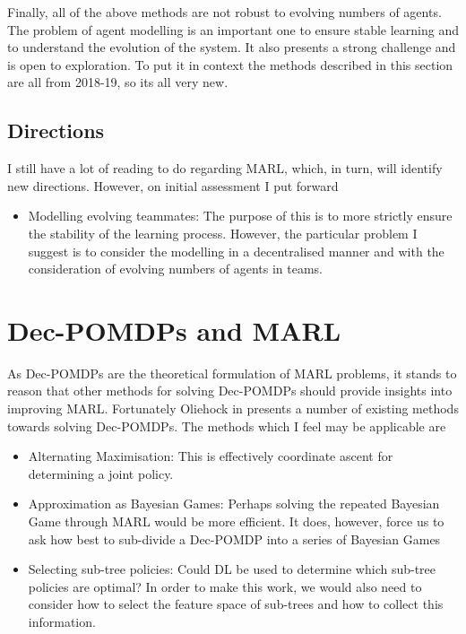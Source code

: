 \documentclass[preprint,8pt]{report}
\begin{document}
Finally, all of the above methods are not robust to evolving numbers of agents. The problem of agent modelling is an important one to ensure stable learning and to understand the evolution of the system. It also presents a strong challenge and is open to exploration. To put it in context the methods described in this section are all from 2018-19, so its all very new.

\subsection{Directions}

I still have a lot of reading to do regarding MARL, which, in turn, will identify new directions. However, on initial assessment I put forward

\begin{itemize}
    \item Modelling evolving teammates: The purpose of this is to more strictly ensure the stability of the learning process. However, the particular problem I suggest is to consider the modelling in a decentralised manner and with the consideration of evolving numbers of agents in teams.
\end{itemize}


\section{Dec-POMDPs and MARL}

As Dec-POMDPs are the theoretical formulation of MARL problems, it stands to reason that other methods for solving Dec-POMDPs should provide insights into improving MARL. Fortunately Oliehock in \cite{OliehoekDecentralizedPOMDPs} presents a number of existing methods towards solving Dec-POMDPs. The methods which I feel may be applicable are 
\begin{itemize}
    \item Alternating Maximisation: This is effectively coordinate ascent for determining a joint policy.
    \item Approximation as Bayesian Games: Perhaps solving the repeated Bayesian Game through MARL would be more efficient. It does, however, force us to ask how best to sub-divide a Dec-POMDP into a series of Bayesian Games 
    \item Selecting sub-tree policies: Could DL be used to determine which sub-tree policies are optimal? In order to make this work, we would also need to consider how to select the feature space of sub-trees and how to collect this information.
\end{itemize}
\end{document}

